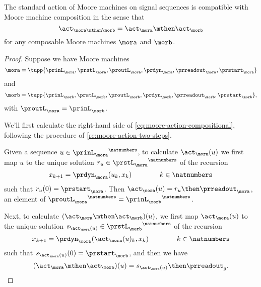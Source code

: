 \begin{proposition}
\label{prop:moore-action-is-a-morphism}
The standard action of Moore machines on signal sequences is compatible with Moore machine composition in the sense that
\begin{equation}
\label{eq:moore-action-compositional}
\act_{\mora \mthen \morb} = \act_\mora \mthen \act_\morb
\end{equation}
for any composable Moore machines $\mora$ and $\morb$.
\end{proposition}

\begin{proof}
    Suppose we have Moore machines
    \begin{equation}
        \mora = \tupp{\prinL_{\mora},\prstL_{\mora},\proutL_{\mora},\prdyn_{\mora},\prreadout_{\mora},\prstart_{\mora}}
    \end{equation}
    and
    \begin{equation}
        \morb = \tupp{\prinL_{\morb},\prstL_{\morb},\proutL_{\morb},\prdyn_{\morb},\prreadout_{\morb},\prstart_{\morb}},
    \end{equation}
    with $\proutL_\mora = \prinL_\morb$.

    We'll first calculate the right-hand side of \cref{eq:moore-action-compositional}, following the procedure of \cref{re:moore-action-two-steps}.

    Given a sequence $u \in {\prinL_{\mora}}^\natnumbers$, to calculate $\act_\mora(u)$ we first map $u$ to the unique solution $r_u \in {\prstL_{\mora}}^\natnumbers$ of the recursion
    \begin{equation}
        x_{k+1} = \prdyn_\mora(u_k, x_k)  \qquad \qquad k \in \natnumbers
    \end{equation}
    such that $r_u(0) = \prstart_{\mora}$.
    Then $\act_\mora(u) = r_u \then \prreadout_\mora$, an element of ${\proutL_{\mora}}^\natnumbers = {\prinL_{\morb}}^\natnumbers$.

    Next, to calculate $(\act_\mora \mthen \act_\morb)(u)$, we first map $\act_\mora(u)$ to the unique solution $s_{\act_\mora(u)} \in {\prstL_{\morb}}^\natnumbers$ of the recursion
    \begin{equation}
        x_{k+1} = \prdyn_\morb(\act_\mora(u)_k, x_k)  \qquad \qquad k \in \natnumbers
    \end{equation}
    such that $s_{\act_\mora(u)}(0) = \prstart_{\morb}$, and then we have
    \begin{equation}
        \label{eq:Moore-act-composition-1}
        (\act_\mora \mthen \act_\morb)(u) = s_{\act_\mora(u)} \then \prreadout_g.
    \end{equation}


\end{proof}

